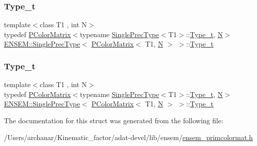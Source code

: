 \subsubsection{\texorpdfstring{Type\_t}{Type\_t}\hspace{0.1cm}{\footnotesize\ttfamily [2/3]}}
{\footnotesize\ttfamily template$<$class T1 , int N$>$ \\
typedef \mbox{\hyperlink{classENSEM_1_1PColorMatrix}{P\+Color\+Matrix}}$<$typename \mbox{\hyperlink{structENSEM_1_1SinglePrecType}{Single\+Prec\+Type}}$<$T1$>$\+::\mbox{\hyperlink{structENSEM_1_1SinglePrecType_3_01PColorMatrix_3_01T1_00_01N_01_4_01_4_a75f8a27b94fdcd735897c0556a26c7e3}{Type\+\_\+t}}, \mbox{\hyperlink{adat__devel_2lib_2hadron_2operator__name__util_8cc_a7722c8ecbb62d99aee7ce68b1752f337}{N}}$>$ \mbox{\hyperlink{structENSEM_1_1SinglePrecType}{E\+N\+S\+E\+M\+::\+Single\+Prec\+Type}}$<$ \mbox{\hyperlink{classENSEM_1_1PColorMatrix}{P\+Color\+Matrix}}$<$ T1, \mbox{\hyperlink{adat__devel_2lib_2hadron_2operator__name__util_8cc_a7722c8ecbb62d99aee7ce68b1752f337}{N}} $>$ $>$\+::\mbox{\hyperlink{structENSEM_1_1SinglePrecType_3_01PColorMatrix_3_01T1_00_01N_01_4_01_4_a75f8a27b94fdcd735897c0556a26c7e3}{Type\+\_\+t}}}

\mbox{\label{structENSEM_1_1SinglePrecType_3_01PColorMatrix_3_01T1_00_01N_01_4_01_4_a75f8a27b94fdcd735897c0556a26c7e3}} 
\subsubsection{\texorpdfstring{Type\_t}{Type\_t}\hspace{0.1cm}{\footnotesize\ttfamily [3/3]}}
{\footnotesize\ttfamily template$<$class T1 , int N$>$ \\
typedef \mbox{\hyperlink{classENSEM_1_1PColorMatrix}{P\+Color\+Matrix}}$<$typename \mbox{\hyperlink{structENSEM_1_1SinglePrecType}{Single\+Prec\+Type}}$<$T1$>$\+::\mbox{\hyperlink{structENSEM_1_1SinglePrecType_3_01PColorMatrix_3_01T1_00_01N_01_4_01_4_a75f8a27b94fdcd735897c0556a26c7e3}{Type\+\_\+t}}, \mbox{\hyperlink{adat__devel_2lib_2hadron_2operator__name__util_8cc_a7722c8ecbb62d99aee7ce68b1752f337}{N}}$>$ \mbox{\hyperlink{structENSEM_1_1SinglePrecType}{E\+N\+S\+E\+M\+::\+Single\+Prec\+Type}}$<$ \mbox{\hyperlink{classENSEM_1_1PColorMatrix}{P\+Color\+Matrix}}$<$ T1, \mbox{\hyperlink{adat__devel_2lib_2hadron_2operator__name__util_8cc_a7722c8ecbb62d99aee7ce68b1752f337}{N}} $>$ $>$\+::\mbox{\hyperlink{structENSEM_1_1SinglePrecType_3_01PColorMatrix_3_01T1_00_01N_01_4_01_4_a75f8a27b94fdcd735897c0556a26c7e3}{Type\+\_\+t}}}



The documentation for this struct was generated from the following file\+:\begin{DoxyCompactItemize}
\item 
/\+Users/archanar/\+Kinematic\+\_\+factor/adat-\/devel/lib/ensem/\mbox{\hyperlink{adat-devel_2lib_2ensem_2ensem__primcolormat_8h}{ensem\+\_\+primcolormat.\+h}}\end{DoxyCompactItemize}
